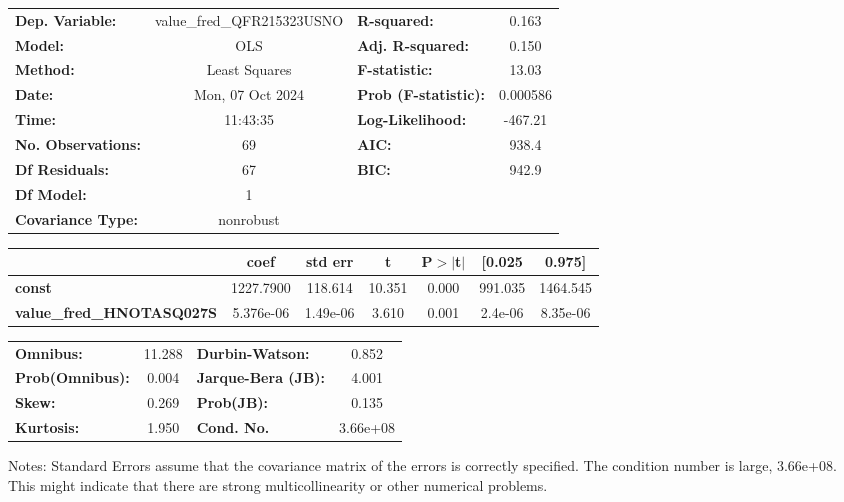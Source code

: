 \begin{center}
\begin{tabular}{lclc}
\toprule
\textbf{Dep. Variable:}           & value\_fred\_QFR215323USNO & \textbf{  R-squared:         } &     0.163   \\
\textbf{Model:}                   &            OLS             & \textbf{  Adj. R-squared:    } &     0.150   \\
\textbf{Method:}                  &       Least Squares        & \textbf{  F-statistic:       } &     13.03   \\
\textbf{Date:}                    &      Mon, 07 Oct 2024      & \textbf{  Prob (F-statistic):} &  0.000586   \\
\textbf{Time:}                    &          11:43:35          & \textbf{  Log-Likelihood:    } &   -467.21   \\
\textbf{No. Observations:}        &               69           & \textbf{  AIC:               } &     938.4   \\
\textbf{Df Residuals:}            &               67           & \textbf{  BIC:               } &     942.9   \\
\textbf{Df Model:}                &                1           & \textbf{                     } &             \\
\textbf{Covariance Type:}         &         nonrobust          & \textbf{                     } &             \\
\bottomrule
\end{tabular}
\begin{tabular}{lcccccc}
                                  & \textbf{coef} & \textbf{std err} & \textbf{t} & \textbf{P$> |$t$|$} & \textbf{[0.025} & \textbf{0.975]}  \\
\midrule
\textbf{const}                    &    1227.7900  &      118.614     &    10.351  &         0.000        &      991.035    &     1464.545     \\
\textbf{value\_fred\_HNOTASQ027S} &    5.376e-06  &     1.49e-06     &     3.610  &         0.001        &      2.4e-06    &     8.35e-06     \\
\bottomrule
\end{tabular}
\begin{tabular}{lclc}
\textbf{Omnibus:}       & 11.288 & \textbf{  Durbin-Watson:     } &    0.852  \\
\textbf{Prob(Omnibus):} &  0.004 & \textbf{  Jarque-Bera (JB):  } &    4.001  \\
\textbf{Skew:}          &  0.269 & \textbf{  Prob(JB):          } &    0.135  \\
\textbf{Kurtosis:}      &  1.950 & \textbf{  Cond. No.          } & 3.66e+08  \\
\bottomrule
\end{tabular}
\end{center}

Notes: \newline
 [1] Standard Errors assume that the covariance matrix of the errors is correctly specified. \newline
 [2] The condition number is large, 3.66e+08. This might indicate that there are \newline
 strong multicollinearity or other numerical problems.